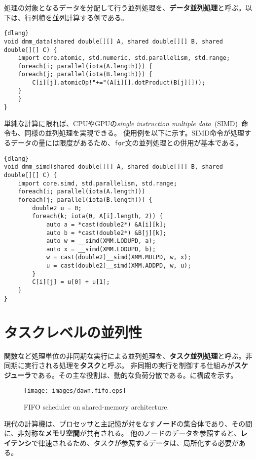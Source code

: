 \documentclass[10pt,a4paper]{book}
\begin{document}
処理の対象となるデータを分配して行う並列処理を、\textbf{データ並列処理}と呼ぶ。以下は、行列積を並列計算する例である。

\begin{Verbatim}{dlang}
void dmm_data(shared double[][] A, shared double[][] B, shared double[][] C) {
	import core.atomic, std.numeric, std.parallelism, std.range;
	foreach(i; parallel(iota(A.length))) {
	foreach(j; parallel(iota(B.length))) {
		C[i][j].atomicOp!"+="(A[i][].dotProduct(B[j][]));
	}
	}
}
\end{Verbatim}

単純な計算に限れば、CPUやGPUの\textit{single instruction multiple data}~(SIMD)~命令も、同様の並列処理を実現できる。
使用例を以下に示す。SIMD命令が処理するデータの量には限度があるため、\texttt{for}文の並列処理との併用が基本である。

\begin{Verbatim}{dlang}
void dmm_simd(shared double[][] A, shared double[][] B, shared double[][] C) {
	import core.simd, std.parallelism, std.range;
	foreach(i; parallel(iota(A.length)))
	foreach(j; parallel(iota(B.length))) {
		double2 u = 0;
		foreach(k; iota(0, A[i].length, 2)) {
			auto a = *cast(double2*) &A[i][k];
			auto b = *cast(double2*) &B[j][k];
			auto w = __simd(XMM.LODUPD, a);
			auto x = __simd(XMM.LODUPD, b);
			w = cast(double2)__simd(XMM.MULPD, w, x);
			u = cast(double2)__simd(XMM.ADDPD, w, u);
		}
		C[i][j] = u[0] + u[1];
	}
}
\end{Verbatim}

\section{タスクレベルの並列性}

関数など処理単位の非同期な実行による並列処理を、\textbf{タスク並列処理}と呼ぶ。非同期に実行される処理を\textbf{タスク}と呼ぶ。
非同期の実行を制御する仕組みが\textbf{スケジューラ}である。その主な役割は、動的な負荷分散である。に構成を示す。

\begin{figure}[h]
\centering
\texttt{[image: images/dawn.fifo.eps]}
\caption{FIFO scheduler on shared-memory architecture.\label{fig:fifo}}
\end{figure}

現代の計算機は、プロセッサと主記憶が対をなす\textbf{ノード}の集合体であり、その間に、非対称な\textbf{メモリ空間}が共有される。
他のノードのデータを参照すると、\textbf{レイテンシ}で律速されるため、タスクが参照するデータは、局所化する必要がある。
\end{document}
